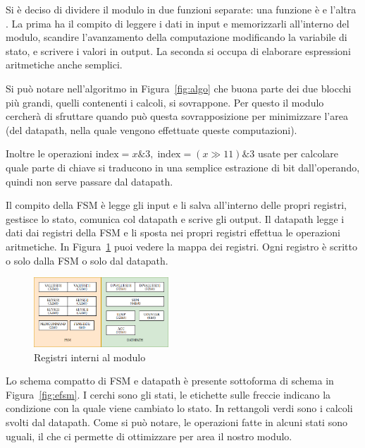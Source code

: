 Si è deciso di dividere il modulo in due funzioni separate: una funzione è  e l'altra . La prima ha il compito di leggere i dati in input e memorizzarli all'interno del modulo, scandire l'avanzamento della computazione modificando la variabile di stato, e scrivere i valori in output. La seconda si occupa di elaborare espressioni aritmetiche anche semplici. 

Si può notare nell'algoritmo in Figura~\ref{fig:algo} che buona parte dei due blocchi più grandi, quelli contenenti i calcoli, si sovrappone. Per questo il modulo cercherà di sfruttare quando può questa sovrapposizione per minimizzare l'area (del datapath, nella quale vengono effettuate queste computazioni). 

Inoltre le operazioni $\text{index} = x \text{\&} 3, \; \text{index} = (x \gg 11) \text{\&} 3$ usate per calcolare quale parte di chiave si traducono in una semplice estrazione di bit dall'operando, quindi non serve passare dal datapath.

Il compito della FSM è legge gli input e li salva all'interno delle propri registri, gestisce lo stato, comunica col datapath e scrive gli output. Il datapath legge i dati dai registri della FSM e li sposta nei propri registri effettua le operazioni aritmetiche. In Figura~\ref{fig:internal} puoi vedere la mappa dei registri. Ogni registro è scritto o solo dalla FSM o solo dal datapath.

\begin{figure}[htbp]
    \centering
    \includegraphics[width=0.45\textwidth]{schemi/rtl_registers.png}
    \caption{Registri interni al modulo}
    \label{fig:internal}
\end{figure}

Lo schema compatto di FSM e datapath è presente sottoforma di schema in Figura~\ref{fig:efsm}. I cerchi sono gli stati, le etichette sulle freccie indicano la condizione con la quale viene cambiato lo stato. In rettangoli verdi sono i calcoli svolti dal datapath. Come si può notare, le operazioni fatte in alcuni stati sono uguali, il che ci permette di ottimizzare per area il nostro modulo. 

